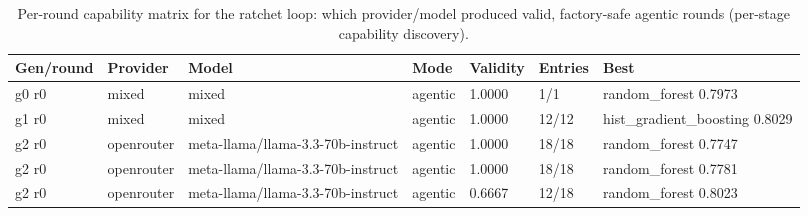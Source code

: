 \begin{table}[H]
\centering\small
\caption{Per-round capability matrix for the ratchet loop: which provider/model produced valid, factory-safe agentic rounds (per-stage capability discovery).}
\label{tab:ratchet-rounds-ratchet-ledger-clinvar}
\begin{tabular}{lllllll}
\toprule
Gen/round & Provider & Model & Mode & Validity & Entries & Best \\
\midrule
g0 r0 & mixed & mixed & agentic & 1.0000 & 1/1 & random\_forest 0.7973 \\
g1 r0 & mixed & mixed & agentic & 1.0000 & 12/12 & hist\_gradient\_boosting 0.8029 \\
g2 r0 & openrouter & meta-llama/llama-3.3-70b-instruct & agentic & 1.0000 & 18/18 & random\_forest 0.7747 \\
g2 r0 & openrouter & meta-llama/llama-3.3-70b-instruct & agentic & 1.0000 & 18/18 & random\_forest 0.7781 \\
g2 r0 & openrouter & meta-llama/llama-3.3-70b-instruct & agentic & 0.6667 & 12/18 & random\_forest 0.8023 \\
\bottomrule
\end{tabular}
\end{table}
